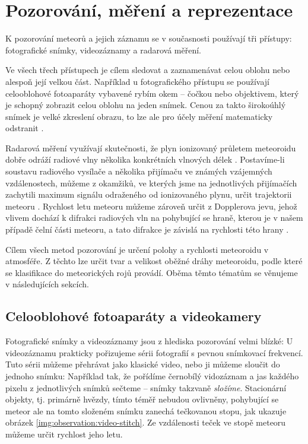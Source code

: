 \chapter{Pozorování, měření a reprezentace}%
K pozorování meteorů a jejich záznamu se v současnosti používají tři přístupy: fotografické snímky, videozáznamy a radarová měření.

Ve všech třech přístupech je cílem sledovat a zaznamenávat celou oblohu nebo alespoň její velkou část. Například u fotografického přístupu se používají celooblohové fotoaparáty vybavené rybím okem \cite{ceplecha} -- čočkou nebo objektivem, který je schopný zobrazit celou oblohu na jeden snímek. Cenou za takto širokoúhlý snímek je velké zkreslení obrazu, to lze ale pro účely měření matematicky odstranit \cite{ceplecha}.

\smallskip

Radarová měření využívají skutečnosti, že plyn ionizovaný průletem meteoroidu dobře odráží radiové vlny několika konkrétních vlnových délek \cite{radiosurvey}. Postavíme-li soustavu radiového vysílače a několika přijímaču ve známých vzájemných vzdálenostech, můžeme z okamžiků, ve kterých jsme na jednotlivých přijímačích zachytili maximum signálu odraženého od ionizovaného plynu, určit trajektorii meteoru \cite{radiosurvey}. Rychlost letu meteoru můžeme zároveň určit z Dopplerova jevu, jehož vlivem dochází k difrakci radiových vln na pohybující se hraně, kterou je v našem případě čelní části meteoru, a tato difrakce je závislá na rychlosti této hrany \cite{radiosurvey}.

\smallskip

Cílem všech metod pozorování je určení polohy a rychlosti meteoroidu v atmosféře. Z těchto lze určit tvar a velikost oběžné dráhy meteoroidu, podle které se klasifikace do meteorických rojů provádí. Oběma těmto tématům se věnujeme v následujících sekcích.

\section{Celooblohové fotoaparáty a videokamery}%
Fotografické snímky a videozáznamy jsou z hlediska pozorování velmi blízké: U videozáznamu prakticky pořizujeme sérii fotografií s pevnou snímkovací frekvencí. Tuto sérii můžeme přehrávat jako klasické video, nebo ji můžeme sloučit do jednoho snímku: Například tak, že pořídíme černobílý vidozáznam a jas každého pixelu z jednotlivých snímků sečteme -- snímky takzvaně \textit{složíme}. Stacionární objekty, tj. primárně hvězdy, tímto téměř nebudou ovlivněny, pohybující se meteor ale na tomto složeném snímku zanechá tečkovanou stopu, jak ukazuje obrázek \ref{img:observation:video-stitch}. Ze vzdálenosti teček ve stopě meteoru můžeme určit rychlost jeho letu.

